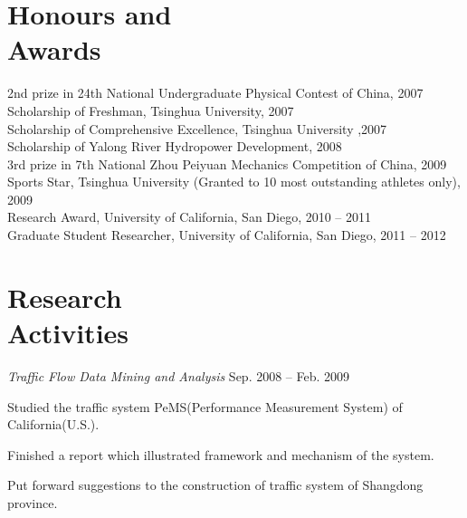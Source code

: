 \documentclass[margin,line]{resume}
\begin{document}
\begin{resume}
	\section{\mysidestyle Honours and\\Awards} 

	2nd prize in 24th National Undergraduate Physical Contest of China, 2007 \vspace{1mm}\\%
	Scholarship of Freshman, Tsinghua University, 2007 \vspace{1mm}\\%
	Scholarship of Comprehensive Excellence, Tsinghua University ,2007\vspace{1mm}\\%
	Scholarship of Yalong River Hydropower Development, 2008 \vspace{1mm}\\%
	3rd prize in 7th National Zhou Peiyuan Mechanics Competition of China, 2009 \vspace{1mm}\\%
	Sports Star, Tsinghua University (Granted to 10 most outstanding athletes only), 2009 \vspace{1mm}\\%
	Research Award, University of California, San Diego, 2010 -- 2011  \vspace{1mm}\\%
	Graduate Student Researcher, University of California, San Diego, 2011 -- 2012

	\section{\mysidestyle Research\\Activities}
	
	\textsl{Traffic Flow Data Mining and Analysis} \hfill Sep. 2008 -- Feb. 2009
	\vspace{-2mm}\\\vspace{-1mm}%
	\begin{list2}
		\item Studied the traffic system PeMS(Performance Measurement System) of California(U.S.).
		\item Finished a report which illustrated framework and mechanism of the system.
		\item Put forward suggestions to the construction of traffic system of Shangdong province.
	\end{list2}
	

\end{resume}
\end{document}
